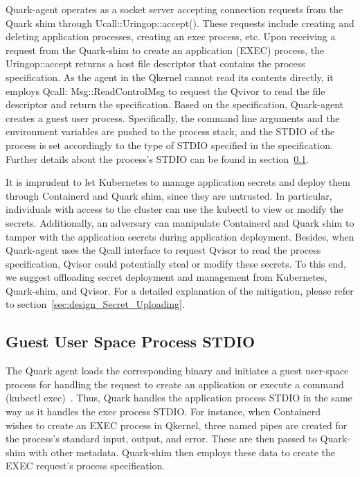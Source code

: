 Quark-agent operates as a socket server accepting connection requests from the Quark shim through Ucall::Uringop::accept(). These requests include creating and deleting application processes, creating an exec process, etc. Upon receiving a request from the Quark-shim to create an application (EXEC) 
 process, the Uringop::accept returns a host file descriptor that contains the process specification. As the agent in the Qkernel cannot read its contents directly, it employs Qcall: Msg::ReadControlMsg to request the Qvivor to read the file descriptor and return the specification. Based on the 
 specification, Quark-agent creates a guest user process. Specifically, the command line arguments and the environment variables are pushed to the process stack, and the STDIO of the process is set accordingly to the type of STDIO specified in the specification. Further details about the process’s 
 STDIO can be found in section~\ref{sec:security_analyse_STDIO}.

It is imprudent to let Kubernetes to manage application secrets and deploy them through Containerd and Quark shim, since they are untrusted. In particular, individuals with access to the cluster can use the kubectl to view or modify the  secrets. Additionally, an adversary can manipulate Containerd 
and Quark shim to tamper with the application secrets during application deployment. Besides, when Quark-agent uses the Qcall interface to request Qvisor to read the process specification, Qvisor could potentially steal or modify these secrets. To this end, we suggest offloading secret deployment and management 
from Kubernetes, Quark-shim, and Qvisor. For a detailed explanation of the mitigation, please refer to section~\ref*{sec:design_Secret_Uploading}.

\subsection{Guest User Space Process STDIO}
\label{sec:security_analyse_STDIO}

The Quark agent loads the corresponding binary and initiates a guest user-space process for handling the request to create an application or execute a command (kubectl exec)~\cite*{k8s}. Thus, Quark handles the application process STDIO in the same way as it handles the exec process STDIO. For instance, 
when Containerd~\cite*{containerd} wishes to create an EXEC process in Qkernel, three named pipes are created for the process’s standard input, output, and error. These are then passed to Quark-shim with other metadata. Quark-shim then employs these data to create the  EXEC request’s process 
specification.

